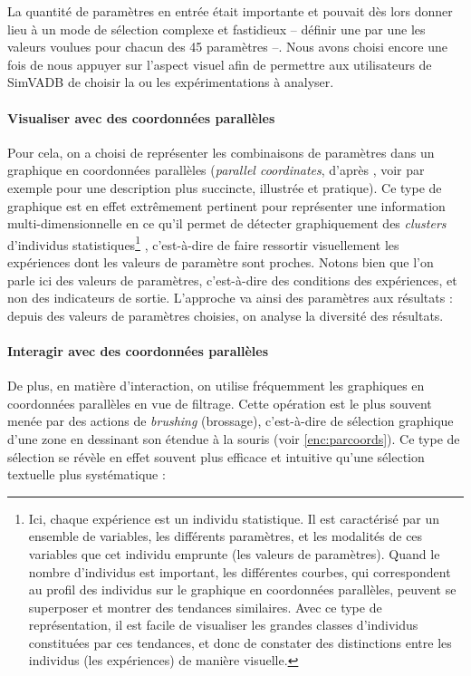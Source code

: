 	La quantité de paramètres en entrée était importante et pouvait dès lors donner lieu à un mode de sélection complexe et fastidieux -- définir une par une les valeurs voulues pour chacun des 45 paramètres --.
	Nous avons choisi encore une fois de nous appuyer sur l'aspect visuel afin de permettre aux utilisateurs de SimVADB de choisir la ou les expérimentations à analyser.
	
	
	\paragraph{Visualiser avec des coordonnées parallèles }

	Pour cela, on a choisi de représenter les combinaisons de paramètres dans un graphique en \og coordonnées parallèles \fg{} (\textit{parallel coordinates}, d'après \cite{inselberg_parallel_1987}, voir \cite{few_multivariate_2006} par exemple pour une description plus succincte, illustrée et pratique).
	Ce type de graphique est en effet extrêmement pertinent pour représenter une information multi-dimensionnelle en ce qu'il permet de détecter graphiquement des \textit{clusters} d'individus statistiques\footnote{
		Ici, chaque expérience est un individu statistique.
		Il est caractérisé par un ensemble de variables, les différents paramètres, et les modalités de ces variables que cet individu emprunte (les valeurs de paramètres).
		Quand le nombre d'individus est important, les différentes \og courbes\fg{}, qui correspondent au profil des individus sur le graphique en coordonnées parallèles, peuvent se superposer et montrer des tendances similaires.
		Avec ce type de représentation, il est facile de visualiser les grandes classes d'individus constituées par ces \og tendances\fg{}, et donc de constater des distinctions entre les individus (les expériences) de manière visuelle.
	} \autocite[2]{heinrich_state_2013}, c'est-à-dire de faire ressortir visuellement les expériences dont les valeurs de paramètre sont proches.
	Notons bien que l'on parle ici des valeurs de paramètres, c'est-à-dire des conditions des expériences, et non des indicateurs de sortie.
	L'approche va ainsi des paramètres aux résultats : depuis des valeurs de paramètres choisies, on analyse la diversité des résultats.

	
	\paragraph{Interagir avec des coordonnées parallèles}
	De plus, en matière d'interaction, on utilise fréquemment les graphiques en coordonnées parallèles en vue de filtrage.
	Cette opération est le plus souvent menée par des actions de \textit{brushing} (\og brossage\fg{}), c'est-à-dire de sélection graphique d'une zone en dessinant son étendue à la souris (voir \cref{enc:parcoords}).
	Ce type de sélection se révèle en effet souvent plus efficace et intuitive qu'une sélection textuelle plus systématique :
	
